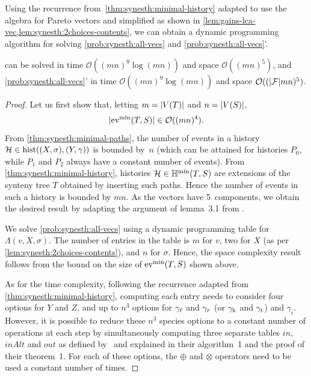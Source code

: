Using the recurrence from~\cref{thm:synesth:minimal-history} adapted to use the algebra for Pareto vectors and simplified as shown in \cref{lem:gains-lca-vec,lem:synesth:2choices-contents}, we can obtain a dynamic programming algorithm for solving \cref{prob:synesth:all-vecs} and \cref*{prob:synesth:all-vecs}'.

\begin{theorem}\label{thm:synesth:all-vecs-complexity}
     can be solved
        in time \(\mathcal{O}((mn)^9\log(mn))\)
        and space \(\mathcal{O}((mn)^5)\),
    and \cref{prob:synesth:all-vecs}'
        in time \(\mathcal{O}((mn)^9\log(mn))\)
        and space \(\mathcal{O}((|\mathcal{F}|mn)^5)\).
\end{theorem}
\begin{proof}
    Let us first show that, letting \(m = |V(T)|\) and \(n = |V(S)|\), \[
        |\mathrm{ev}^{\mathrm{min}}(T, S)| \in \mathcal{O}((mn)^4).
    \]
    From \cref{thm:synesth:minimal-paths}, the number of events in a history \(\mathcal{H} \in \mathrm{hist}((X, \sigma), (Y, \gamma))\) is bounded by~\(n\) (which can be attained for histories \(P_0\), while \(P_1\) and \(P_2\) always have a constant number of events).
    From \cref{thm:synesth:minimal-history}, histories \(\mathcal{H} \in \mathbb{H}^{\mathrm{min}}(T, S)\) are extensions of the synteny tree \(T\) obtained by inserting such paths.
    Hence the number of events in such a history is bounded by \(mn\).
    As the vectors have 5~components, we obtain the desired result by adapting the argument of lemma~3.1 from \textcite{LibeskindHadas2014ParetoOptimalPhylogenetic}.

    We solve \cref{prob:synesth:all-vecs} using a dynamic programming table for \(\Lambda(v, X, \sigma)\).
    The number of entries in the table is
        \(m\) for \(v\),
        two for \(X\) (as per \cref{lem:synesth:2choices-contents}),
        and \(n\) for \(\sigma\).
    Hence, the space complexity result follows from the bound on the size of \(\mathrm{ev}^{\mathrm{min}}(T, S)\) shown above.

    As for the time complexity, following the recurrence adapted from \cref{thm:synesth:minimal-history}, computing each entry needs to consider four options for \(Y\) and \(Z\), and up to \(n^3\) options for \(\gamma_\mathit{\ell}\) and \(\gamma_r\) (or \(\gamma_\mathrm{k}\) and \(\gamma_\mathrm{t}\)) and \(\gamma_i\).
    However, it is possible to reduce these \(n^3\) species options to a constant number of operations at each step by simultaneously computing three separate tables \(\mathit{in}\), \(\mathit{inAlt}\) and \(\mathit{out}\) as defined by~\textcite{Weiner2021ImprovedDuplicationTransfer} and explained in their algorithm~1 and the proof of their theorem~1.
    For each of these options, the \(\oplus\) and \(\otimes\) operators need to be used a constant number of times.


\end{proof}
